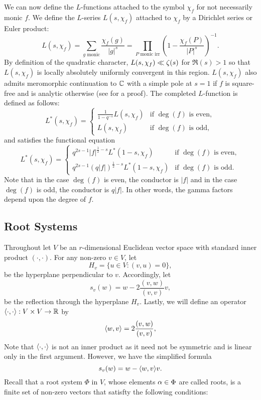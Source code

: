 \documentclass[12pt,reqno,oneside]{amsart}
\begin{document}
        We can now define the $L$-functions attached to the symbol $\chi_{f}$ for not necessarily monic $f$. We define the $L$-series $L(s,\chi_{f})$ attached to $\chi_{f}$ by a Dirichlet series or Euler product:
        \[
            L(s,\chi_{f}) = \sum_{\text{$g$ monic}}\frac{\chi_{f}(g)}{|g|^{s}} = \prod_{\text{$P$ monic irr}}\left(1-\frac{\chi_{f}(P)}{|P|^{s}}\right)^{-1}.
        \]
        By definition of the quadratic character, $L(s,\chi_{f}) \ll \zeta(s)$ for $\Re(s) > 1$ so that $L(s,\chi_{f})$ is locally absolutely uniformly convergent in this region. $L(s,\chi_{f})$ also admits meromorphic continuation to $\mathbb{C}$ with a simple pole at $s = 1$ if $f$ is square-free and is analytic otherwise (see \cite{R} for a proof). The completed $L$-function is defined as follows:
        \[
            L^{\ast}(s,\chi_{f}) = \begin{cases} \frac{1}{1-q^{-s}}L(s,\chi_{f}) & \text{if $\deg(f)$ is even}, \\ L(s,\chi_{f}) & \text{if $\deg(f)$ is odd}, \end{cases}
        \]
        and satisfies the functional equation
        \[
            L^{\ast}(s,\chi_{f}) = \begin{cases} q^{2s-1}|f|^{\frac{1}{2}-s}L^{\ast}(1-s,\chi_{f}) & \text{if $\deg(f)$ is even}, \\ q^{2s-1}(q|f|)^{\frac{1}{2}-s}L^{\ast}(1-s,\chi_{f}) & \text{if $\deg(f)$ is odd}. \end{cases}
        \]
        Note that in the case $\deg(f)$ is even, the conductor is $|f|$ and in the case $\deg(f)$ is odd, the conductor is $q|f|$. In other words, the gamma factors depend upon the degree of $f$.
    \subsection*{Root Systems}
        Throughout let $V$ be an $r$-dimensional Euclidean vector space with standard inner product $(\cdot,\cdot)$. For any non-zero $v \in V$, let
        \[
            H_{v} = \{u \in V:(v,u) = 0\},
        \]
        be the hyperplane perpendicular to $v$. Accordingly, let
        \[
            s_{v}(w) = w-2\frac{(v,w)}{(v,v)}v, 
        \]
        be the reflection through the hyperplane $H_{v}$. Lastly, we will define an operator $\langle\cdot,\cdot\rangle:V \times V \to \mathbb{R}$ by
        \[
            \langle w,v\rangle = 2\frac{(v,w)}{(v,v)},
        \]
        Note that $\langle\cdot,\cdot\rangle$ is not an inner product as it need not be symmetric and is linear only in the first argument. However, we have the simplified formula
        \[
            s_{v}(w) = w-\langle w,v\rangle v.
        \]
        Recall that a root system $\Phi$ in $V$, whose elements $\alpha \in \Phi$ are called roots, is a finite set of non-zero vectors that satisfty the following conditions:
\end{document}
